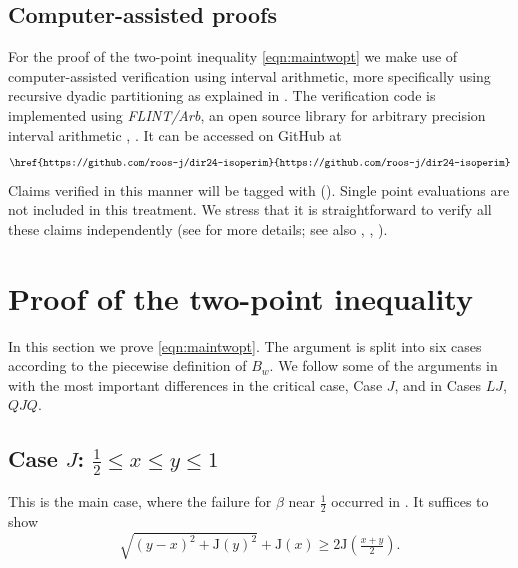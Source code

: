 \documentclass[11pt]{amsart}
\theoremstyle{plain}
\theoremstyle{definition}
\theoremstyle{remark}
\numberwithin{equation}{section}
\begin{document}
\subsection{Computer-assisted proofs}
For the proof of the two-point inequality \eqref{eqn:maintwopt}
we make use of computer-assisted verification using interval arithmetic, more specifically using recursive dyadic partitioning as explained in \cite[\S 4]{DIR24}. The verification code is implemented using \emph{FLINT/Arb}, an open source library for arbitrary precision interval arithmetic \cite{Arb}, \cite{Flint}.
It can be accessed on GitHub at
\[
\texttt{\href{https://github.com/roos-j/dir24-isoperim}{https://github.com/roos-j/dir24-isoperim}}
\]
Claims verified in this manner will be tagged with ({\tiny\faCar}). Single point evaluations are not included in this treatment. We stress that it is straightforward to verify all these claims independently (see \cite[\S 4]{DIR24} for more details; see also \cite{Tuc11}, \cite{Rump}, \cite{GomezSerrano}).

\section{Proof of the two-point inequality}\label{sec:maintwopt}
In this section we prove \eqref{eqn:maintwopt}. The argument is split into six cases according to the piecewise definition of $B_w$.
We follow some of the arguments in \cite[\S 6]{DIR24} with the most important differences in the critical case, Case $J$,
and in Cases $LJ$, $QJQ$.

\subsection{\texorpdfstring{Case $J$: $\frac12\le x\le y\le 1$}{Case J}}
\label{sec:caseJ}
This is the main case, where the failure for $\beta$ near $\frac12$ occurred in \cite{DIR24}.
It suffices to show
\begin{equation}
\label{eq:caseJ}
\sqrt{(y-x)^2 + {\mathrm{J}}(y)^2} + {\mathrm{J}}(x)\ge 2 {\mathrm{J}}( \tfrac{x+y}{2}).
\end{equation}
\end{document}
